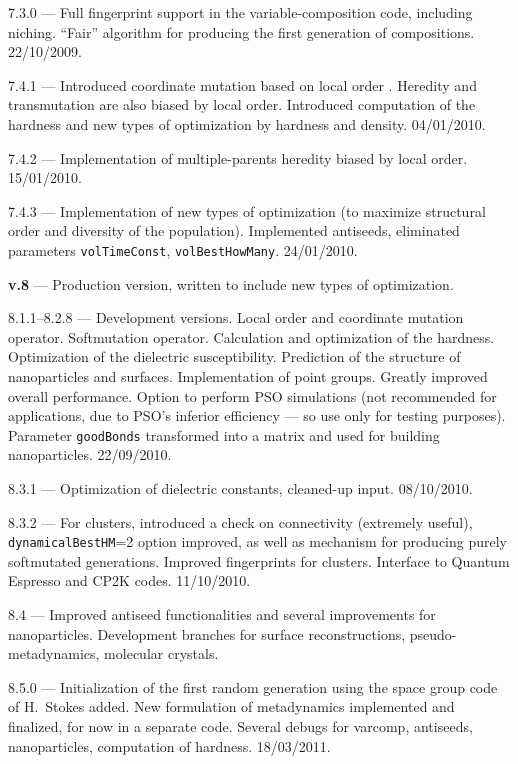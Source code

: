 \documentclass[12pt]{article}
\newcommand{\keyword}[1]{\texttt{#1}}
\begin{document}
{7.3.0 --- Full fingerprint support in the variable-composition code, including
niching. ``Fair'' algorithm for producing the first generation of compositions.
22/10/2009.

7.4.1 --- Introduced coordinate mutation based on local order \cite{Oganov2009}.
Heredity and transmutation are also biased by local order. Introduced
computation of the hardness and new types of optimization by hardness and
density. 04/01/2010.

7.4.2 --- Implementation of multiple-parents heredity biased by local order.
15/01/2010.

7.4.3 --- Implementation of new types of optimization (to maximize
structural order and diversity of the population). Implemented antiseeds,
eliminated parameters \keyword{volTimeConst}, \keyword{volBestHowMany}.
24/01/2010.

\textbf{v.8} --- Production version, written to include new types of
optimization.

8.1.1--8.2.8 --- Development versions. Local order and coordinate mutation
operator. Softmutation operator. Calculation and optimization of the hardness.
Optimization of the dielectric susceptibility. Prediction of the structure of
nanoparticles and surfaces. Implementation of point groups. Greatly improved
overall performance. Option to perform PSO simulations (not recommended for
applications, due to PSO's inferior efficiency --- so use only for testing
purposes). Parameter \keyword{goodBonds} transformed into a matrix and used for
building nanoparticles. 22/09/2010.

8.3.1 --- Optimization of dielectric constants, cleaned-up input. 08/10/2010.

8.3.2 --- For clusters, introduced a check on connectivity (extremely useful),
\keyword{dynamicalBestHM}=2 option improved, as well as mechanism for producing
purely softmutated generations. Improved fingerprints for clusters.
Interface to Quantum Espresso and CP2K codes. 11/10/2010.

8.4 --- Improved antiseed functionalities and several improvements for
nanoparticles. Development branches for surface reconstructions,
pseudo-metadynamics, molecular crystals.

8.5.0 --- Initialization of the first random generation using the space group
code of H.~Stokes added. New formulation of metadynamics implemented and
finalized, for now in a separate code. Several debugs for varcomp, antiseeds,
nanoparticles, computation of hardness. 18/03/2011.

}
\end{document}
